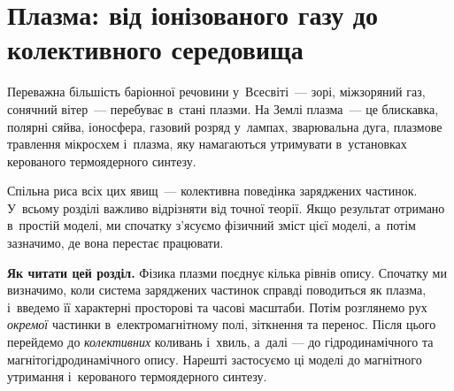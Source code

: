 
\graphicspath{{\currfilebase/Pictures}}

\providecommand{\figstub}[2][0.6]{%
	\fbox{\parbox[c][3.4cm][c]{\dimexpr#1\linewidth-2\fboxsep-2\fboxrule\relax}{\centering\small\itshape
	#2}}}




\chapter{Плазма: від іонізованого газу до колективного середовища}\label{sec:plasma-basics}\hypertarget{plasma-basics}{}
\hypertarget{PlasmaPhysics}{}

Переважна більшість баріонної речовини у~Всесвіті~--- зорі, міжзоряний газ, сонячний
вітер~--- перебуває в~стані плазми. На Землі плазма~--- це блискавка, полярні сяйва,
іоносфера, газовий розряд у~лампах, зварювальна дуга, плазмове травлення мікросхем
і~плазма, яку намагаються утримувати в~установках керованого термоядерного синтезу.

Спільна риса всіх цих явищ~--- колективна поведінка заряджених частинок. У~всьому розділі
важливо відрізняти  від точної теорії. Якщо результат отримано
в~простій моделі, ми спочатку з'ясуємо фізичний зміст цієї моделі, а~потім зазначимо, де
вона перестає працювати.



\begin{Attention}
\textbf{Як читати цей розділ.} Фізика плазми поєднує кілька рівнів опису. Спочатку ми
визначимо, коли система заряджених частинок справді поводиться як плазма, і~введемо її
характерні просторові та часові масштаби. Потім розглянемо рух \emph{окремої} частинки
в~електромагнітному полі, зіткнення та перенос. Після цього перейдемо до
\emph{колективних} коливань і~хвиль, а~далі --- до гідродинамічного та
магнітогідродинамічного опису. Нарешті застосуємо ці моделі до магнітного утримання
і~керованого термоядерного синтезу.
\end{Attention}

